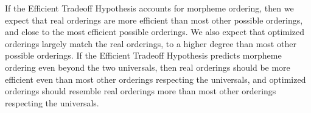\documentclass[man]{apa7}
\begin{document}

If the Efficient Tradeoff Hypothesis accounts for morpheme ordering, then we expect that real orderings are more efficient than most other possible orderings, and close to the most efficient possible orderings.
We also expect that optimized orderings largely match the real orderings, to a higher degree than most other possible orderings.
If the Efficient Tradeoff Hypothesis predicts morpheme ordering even beyond the two universals, then real orderings should be more efficient even than most other orderings respecting the universals, and optimized orderings should resemble real orderings more than most other orderings respecting the universals.
\end{document}
